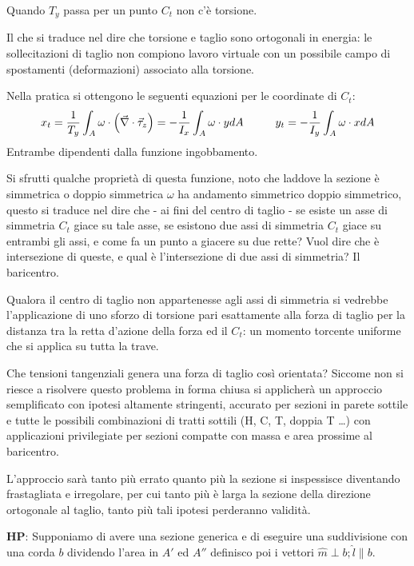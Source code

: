 \documentclass{article}
\begin{document}
\begin{adjustwidth}{2in}{}
		 Quando $T_y$ passa per un punto $C_t$ non c'è torsione.
		 
		 Il che si traduce nel dire che  torsione e taglio sono ortogonali in energia: le sollecitazioni di taglio non compiono lavoro virtuale con un possibile campo di spostamenti (deformazioni) associato alla torsione. \newline
		 
		 Nella pratica si ottengono le seguenti equazioni per le coordinate di $C_t$:
		 \[  x_t = {1\over T_y} \int_A\omega \cdot \left(\vec{\nabla}\cdot\vec{\tau}_z\right) = -{1\over I_x}\int_A\omega\cdot ydA \hspace{1cm} y_t = -{1\over I_y}\int_A\omega\cdot xdA\]
		 Entrambe dipendenti dalla funzione ingobbamento. 
		 
		 Si sfrutti qualche proprietà di questa funzione, noto che laddove la sezione è simmetrica o doppio simmetrica $\omega$ ha andamento simmetrico doppio simmetrico, questo si traduce nel dire che - ai fini del centro di taglio - se esiste un asse  di simmetria $C_t$ giace su tale asse, se esistono due assi di simmetria $C_t$ giace su entrambi gli assi, e come fa un punto a giacere su due rette? Vuol dire che è intersezione di queste, e qual è l'intersezione di due assi di simmetria? Il baricentro. 
		 
		 Qualora il centro di taglio non appartenesse agli assi di simmetria si vedrebbe l'applicazione di uno sforzo di torsione pari esattamente alla forza di taglio per la distanza tra la retta d'azione della forza ed il $C_t$: un momento torcente uniforme che si applica su tutta la trave. \newline 
		 
		 Che tensioni tangenziali genera una forza di taglio così orientata? Siccome non si riesce a risolvere questo problema in forma chiusa si applicherà un approccio semplificato con ipotesi altamente stringenti, accurato per sezioni in parete sottile e tutte le possibili combinazioni di tratti sottili (H, C, T, doppia T \dots) con applicazioni privilegiate per sezioni compatte con massa e area prossime al baricentro. 
		 
		 L'approccio sarà tanto più errato quanto più la sezione si inspessisce diventando frastagliata e irregolare, per cui tanto più è larga la sezione della direzione ortogonale al taglio, tanto più tali ipotesi perderanno validità.\newline 
		 
		 \textbf{HP}: Supponiamo di avere una sezione generica e di eseguire una suddivisione con una corda $b$ dividendo l'area in $A'$ ed $A''$ definisco poi i vettori $\hat{m} \perp b; \hat{l} \parallel b$. 
		 

\end{adjustwidth}
\end{document}
